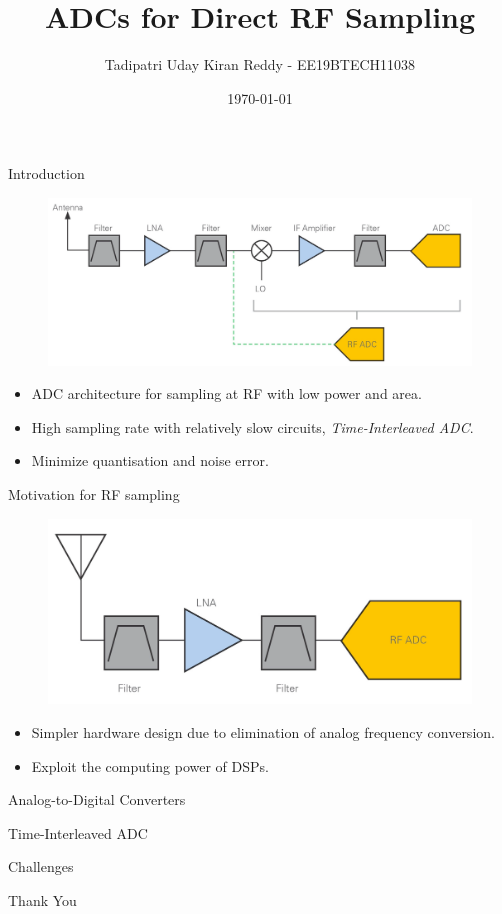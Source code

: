 \documentclass{beamer}
\title[Tadipatri Uday Kiran Reddy]{ADCs for Direct RF Sampling}
\author{Tadipatri Uday Kiran Reddy - EE19BTECH11038}
\institute[]{IIT Hyderabad}
\date{\today}
\begin{document}
\begin{frame}
  \titlepage
\end{frame}

\begin{frame}{Introduction}
\begin{figure}
	\includegraphics[scale=0.2]{./figs/arch.png}
\end{figure}
\pause
\begin{itemize}
	\item ADC architecture for sampling at RF with low power and area.
	\pause
	\item High sampling rate with relatively slow circuits, \textit{Time-Interleaved ADC}.
	\pause
	\item Minimize quantisation and noise error.
\end{itemize}

\end{frame}

\begin{frame}{Motivation for RF sampling}
\begin{figure}
	\includegraphics[scale=0.2]{./figs/rf_arch.png}
\end{figure}
\begin{itemize}
	\item Simpler hardware design due to elimination of analog frequency conversion.
	\pause
	\item Exploit the computing power of DSPs.
\end{itemize}
\end{frame}

\begin{frame}{Analog-to-Digital Converters}

\end{frame}

\begin{frame}{Time-Interleaved ADC}

\end{frame}

\begin{frame}{Challenges}

\end{frame}






\begin{frame}{}
\centering
 \Huge
 Thank You
\end{frame}
\end{document}
